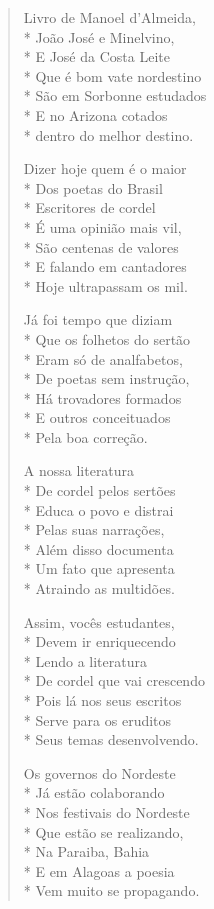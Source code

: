\begin{verse}
Livro de Manoel d'Almeida,\\*
João José e Minelvino,\\*
E José da Costa Leite\\*
Que é bom vate nordestino\\*
São em Sorbonne estudados\\*
E no Arizona cotados\\*
dentro do melhor destino.

Dizer hoje quem é o maior\\*
Dos poetas do Brasil\\*
Escritores de cordel\\*
É uma opinião mais vil,\\*
São centenas de valores\\*
E falando em cantadores\\*
Hoje ultrapassam os mil.

Já foi tempo que diziam\\*
Que os folhetos do sertão\\*
Eram só de analfabetos,\\*
De poetas sem instrução,\\*
Há trovadores formados\\*
E outros conceituados\\*
Pela boa correção.

A nossa literatura\\*
De cordel pelos sertões\\*
Educa o povo e distrai\\*
Pelas suas narrações,\\*
Além disso documenta\\*
Um fato que apresenta\\*
Atraindo as multidões.

Assim, vocês estudantes,\\*
Devem ir enriquecendo\\*
Lendo a literatura\\*
De cordel que vai crescendo\\*
Pois lá nos seus escritos\\*
Serve para os eruditos\\*
Seus temas desenvolvendo.

Os governos do Nordeste\\*
Já estão colaborando\\*
Nos festivais do Nordeste\\*
Que estão se realizando,\\*
Na Paraiba, Bahia\\*
E em Alagoas a poesia\\*
Vem muito se propagando.


\end{verse}

